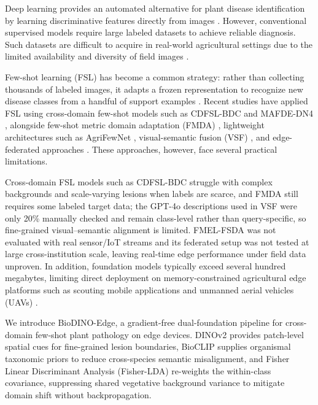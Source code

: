 \documentclass[conference]{IEEEtran}
\begin{document}
Deep learning provides an automated alternative for plant disease identification by learning discriminative features directly from images \cite{shoaib2023advanced}. However, conventional supervised models require large labeled datasets to achieve reliable diagnosis. Such datasets are difficult to acquire in real-world agricultural settings due to the limited availability and diversity of field images \cite{shoaib2023advanced, shafik2023systematic}.

Few-shot learning (FSL) has become a common strategy: rather than collecting thousands of labeled images, it adapts a frozen representation to recognize new disease classes from a handful of support examples \cite{sun2024few}. Recent studies have applied FSL using cross-domain few-shot models such as CDFSL-BDC \cite{yang2024laboratory} and MAFDE-DN4 \cite{zhao2024mafde}, alongside few-shot metric domain adaptation (FMDA) \cite{kudo2025few}, lightweight architectures such as AgriFewNet \cite{babu2025agrifewnet}, visual-semantic fusion (VSF) \cite{zhou2026vsf}, and edge-federated approaches \cite{sharif2026real}. These approaches, however, face several practical limitations.

Cross-domain FSL models such as CDFSL-BDC \cite{yang2024laboratory} struggle with complex backgrounds and scale-varying lesions when labels are scarce, and FMDA \cite{kudo2025few} still requires some labeled target data; the GPT-4o descriptions used in VSF \cite{zhou2026vsf} were only 20\% manually checked and remain class-level rather than query-specific, so fine-grained visual--semantic alignment is limited. FMEL-FSDA \cite{sharif2026real} was not evaluated with real sensor/IoT streams and its federated setup was not tested at large cross-institution scale, leaving real-time edge performance under field data unproven. In addition, foundation models typically exceed several hundred megabytes, limiting direct deployment on memory-constrained agricultural edge platforms such as scouting mobile applications and unmanned aerial vehicles (UAVs) \cite{zhao2026lightweight}.

We introduce BioDINO-Edge, a gradient-free dual-foundation pipeline for cross-domain few-shot plant pathology on edge devices. DINOv2 \cite{oquab2023dinov2} provides patch-level spatial cues for fine-grained lesion boundaries, BioCLIP \cite{stevens2024bioclip} supplies organismal taxonomic priors to reduce cross-species semantic misalignment, and Fisher Linear Discriminant Analysis (Fisher-LDA) \cite{fisher1936use, rao1948utilization} re-weights the within-class covariance, suppressing shared vegetative background variance to mitigate domain shift without backpropagation.
\end{document}
